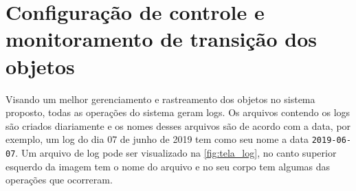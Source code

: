 

\section{Configuração de controle e monitoramento de transição dos objetos}


\par 
Visando um melhor gerenciamento e rastreamento dos objetos no sistema proposto, todas as operações do sistema geram logs. Os arquivos contendo os logs são criados diariamente e os nomes desses arquivos são de acordo com a data, por exemplo, um log do dia 07 de junho de 2019 tem como seu nome a data \texttt{2019-06-07}. Um arquivo de log pode ser visualizado na \autoref{fig:tela_log}, no canto superior esquerdo da imagem tem o nome do arquivo e no seu corpo tem algumas das operações que ocorreram.

